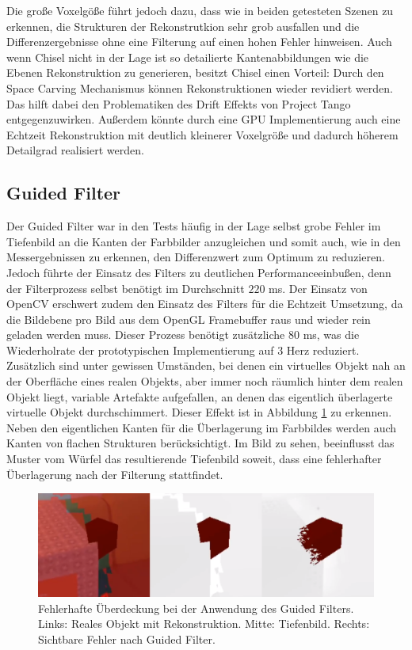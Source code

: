 Die große Voxelgöße führt jedoch dazu, dass wie in beiden getesteten Szenen zu erkennen, die Strukturen der Rekonstrutkion sehr grob ausfallen und die Differenzergebnisse ohne eine Filterung auf einen hohen Fehler hinweisen. Auch wenn Chisel nicht in der Lage ist so detailierte Kantenabbildungen wie die Ebenen Rekonstruktion zu generieren, besitzt Chisel einen Vorteil: Durch den Space Carving Mechanismus können Rekonstruktionen wieder revidiert werden. Das hilft dabei den Problematiken des Drift Effekts von Project Tango entgegenzuwirken. Außerdem könnte durch eine GPU Implementierung auch eine Echtzeit Rekonstruktion mit deutlich kleinerer Voxelgröße und dadurch höherem Detailgrad realisiert werden.


\subsection*{Guided Filter}

Der Guided Filter war in den Tests häufig in der Lage selbst grobe Fehler im Tiefenbild an die Kanten der Farbbilder anzugleichen und somit auch, wie in den Messergebnissen zu erkennen, den Differenzwert zum Optimum zu reduzieren. Jedoch führte der Einsatz des Filters zu deutlichen Performanceeinbußen, denn der Filterprozess selbst benötigt im Durchschnitt \(220\) ms. Der Einsatz von OpenCV erschwert zudem den Einsatz des Filters für die Echtzeit Umsetzung, da die Bildebene pro Bild aus dem OpenGL Framebuffer raus und wieder rein geladen werden muss. Dieser Prozess benötigt zusätzliche \(80\) ms, was die Wiederholrate der prototypischen Implementierung auf 3 Herz reduziert. \\

Zusätzlich sind unter gewissen Umständen, bei denen ein virtuelles Objekt nah an der Oberfläche eines realen Objekts, aber immer noch räumlich hinter dem realen Objekt liegt, variable Artefakte aufgefallen, an denen das eigentlich überlagerte virtuelle Objekt durchschimmert. Dieser Effekt ist in Abbildung \ref{fig:artifacts} zu erkennen. Neben den eigentlichen Kanten für die Überlagerung im Farbbildes werden auch Kanten von flachen Strukturen berücksichtigt. Im Bild zu sehen, beeinflusst das Muster vom Würfel das resultierende Tiefenbild soweit, dass eine fehlerhafter Überlagerung nach der Filterung stattfindet. \\
 
\begin{figure}[h]
  \centering
	\includegraphics[width=1.0\textwidth]{content/images/artifacts.png} 
  \caption{Fehlerhafte Überdeckung bei der Anwendung des Guided Filters. Links: Reales Objekt mit Rekonstruktion. Mitte: Tiefenbild. Rechts: Sichtbare Fehler nach Guided Filter.}
  \label{fig:artifacts}
\end{figure}

